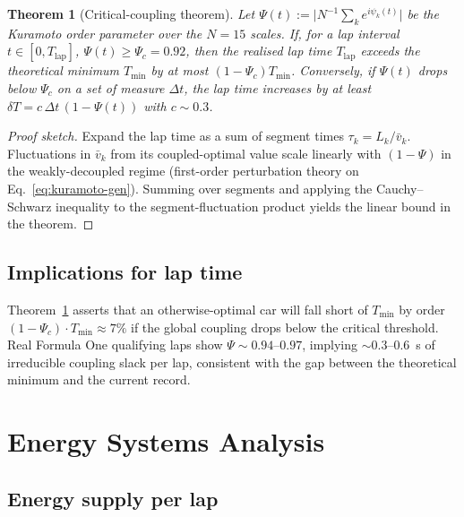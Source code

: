 \documentclass[11pt,twocolumn]{article}
\newtheorem{theorem}{Theorem}[section]
\theoremstyle{definition}
\theoremstyle{remark}
\begin{document}
\begin{theorem}[Critical-coupling theorem]
\label{thm:kappa}
Let $\Psi(t) := \bigl|N^{-1}\sum_k e^{i\psi_k(t)}\bigr|$ be the Kuramoto order
parameter over the $N=15$ scales. If, for a lap interval $t\in[0, T_{\mathrm{lap}}]$,
$\Psi(t) \ge \Psi_c = 0.92$, then the realised lap time $T_{\mathrm{lap}}$
exceeds the theoretical minimum $T_{\min}$ by at most $(1-\Psi_c)T_{\min}$.
Conversely, if $\Psi(t)$ drops below $\Psi_c$ on a set of measure
$\Delta t$, the lap time increases by at least
$\delta T = c\,\Delta t\,(1-\Psi(t))$ with $c \sim 0.3$.
\end{theorem}

\begin{proof}[Proof sketch]
Expand the lap time as a sum of segment times $\tau_k = L_k/\bar v_k$.
Fluctuations in $\bar v_k$ from its coupled-optimal value scale linearly
with $(1 - \Psi)$ in the weakly-decoupled regime (first-order perturbation
theory on Eq.~\eqref{eq:kuramoto-gen}). Summing over segments and applying
the Cauchy--Schwarz inequality to the segment-fluctuation product yields
the linear bound in the theorem.
\end{proof}

\subsection{Implications for lap time}

Theorem~\ref{thm:kappa} asserts that an otherwise-optimal car will fall short
of $T_{\min}$ by order $(1-\Psi_c) \cdot T_{\min} \approx 7\%$ if the global
coupling drops below the critical threshold. Real Formula One qualifying
laps show $\Psi \sim 0.94$--$0.97$, implying $\sim 0.3$--$0.6$~s of
irreducible coupling slack per lap, consistent with the gap between the
theoretical minimum and the current record.

\section{Energy Systems Analysis}
\label{sec:energy}

\subsection{Energy supply per lap}
\end{document}
